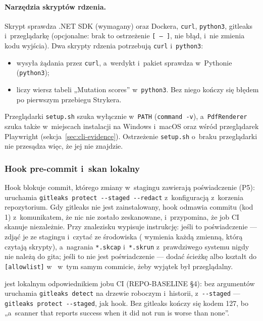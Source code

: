 \paragraph{Narzędzia skryptów rdzenia.} Skrypt sprawdza .NET SDK (wymagany) oraz Dockera,
\texttt{curl}, \texttt{python3}, gitleaks i~przeglądarkę (opcjonalne: brak to ostrzeżenie
\texttt{[ -- ]}, nie błąd, i~nie zmienia kodu wyjścia). Dwa skrypty rdzenia potrzebują
\texttt{curl} i~\texttt{python3}:
\begin{itemize}
  \item {} wysyła żądania przez \texttt{curl}, a~werdykt i~pakiet sprawdza
        w~Pythonie (\texttt{python3});
  \item {} liczy wiersz tabeli „Mutation scores” w~\texttt{python3}.
        Bez niego kończy się błędem po pierwszym przebiegu Strykera.
\end{itemize}
Przeglądarki \texttt{setup.sh} szuka wyłącznie w~\texttt{PATH} (\texttt{command -v}),
a~\texttt{PdfRenderer} szuka także w~miejscach instalacji na Windows i~macOS oraz wśród
przeglądarek Playwright (sekcja~\ref{sec:cli-evidence}). Ostrzeżenie \texttt{setup.sh}
o~braku przeglądarki nie przesądza więc, że  jej nie znajdzie.

\subsubsection{Hook pre-commit i~skan lokalny}

Hook  blokuje commit, którego zmiany w~stagingu zawierają
poświadczenie (P5): uruchamia \texttt{gitleaks protect -{}-staged -{}-redact} z~konfiguracją
 z~korzenia repozytorium. Gdy gitleaks nie jest zainstalowany, hook
odmawia commitu (kod 1) z~komunikatem, że nic nie zostało zeskanowane, i~przypomina, że job
CI skanuje niezależnie. Przy znalezisku wypisuje instrukcję: jeśli to poświadczenie ---
zdjąć je ze stagingu i~czytać ze środowiska ( wymienia każdą
zmienną, którą czytają skrypty), a~nagrania \texttt{*.skcap} i~\texttt{*.skrun} z~prawdziwego systemu nigdy nie należą do gita; jeśli to nie jest poświadczenie --- dodać
ścieżkę albo kształt do \texttt{[allowlist]} w~ w~tym samym commicie,
żeby wyjątek był przeglądalny.

 jest lokalnym odpowiednikiem jobu CI (REPO-BASELINE §4): bez
argumentów uruchamia \texttt{gitleaks detect} na drzewie roboczym i~historii, z~\texttt{-{}-staged} --- \texttt{gitleaks protect -{}-staged}, jak hook. Bez gitleaks kończy
się kodem 127, bo „a~scanner that reports success when it did not run is worse than none”.

